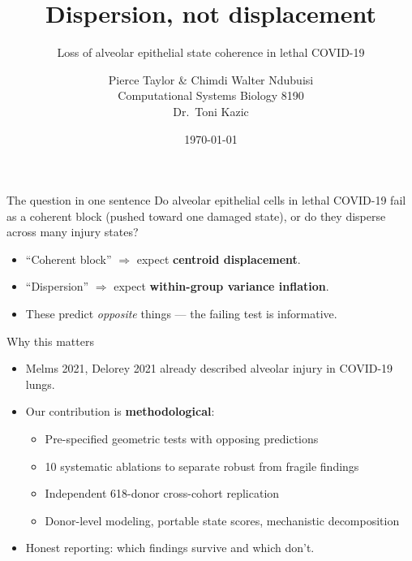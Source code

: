 \documentclass[aspectratio=169]{beamer}
\title{Dispersion, not displacement}
\subtitle{Loss of alveolar epithelial state coherence in lethal COVID-19}
\author{Pierce Taylor \& Chimdi Walter Ndubuisi \\ Computational Systems Biology 8190 \\ Dr.\ Toni Kazic}
\date{\today}
\begin{document}
\maketitle

\begin{frame}{The question in one sentence}
\Large
Do alveolar epithelial cells in lethal COVID-19 fail as a \alert{coherent block} (pushed toward one damaged state), or do they \alert{disperse} across many injury states?
\normalsize
\vspace{1em}
\begin{itemize}
  \item ``Coherent block'' $\Rightarrow$ expect \textbf{centroid displacement}.
  \item ``Dispersion'' $\Rightarrow$ expect \textbf{within-group variance inflation}.
  \item These predict \emph{opposite} things --- the failing test is informative.
\end{itemize}
\end{frame}

\begin{frame}{Why this matters}
\begin{itemize}
  \item Melms 2021, Delorey 2021 already described alveolar injury in COVID-19 lungs.
  \item Our contribution is \textbf{methodological}:
  \begin{itemize}
    \item Pre-specified geometric tests with opposing predictions
    \item 10 systematic ablations to separate robust from fragile findings
    \item Independent 618-donor cross-cohort replication
    \item Donor-level modeling, portable state scores, mechanistic decomposition
  \end{itemize}
  \item Honest reporting: which findings survive and which don't.
\end{itemize}
\end{frame}
\end{document}
